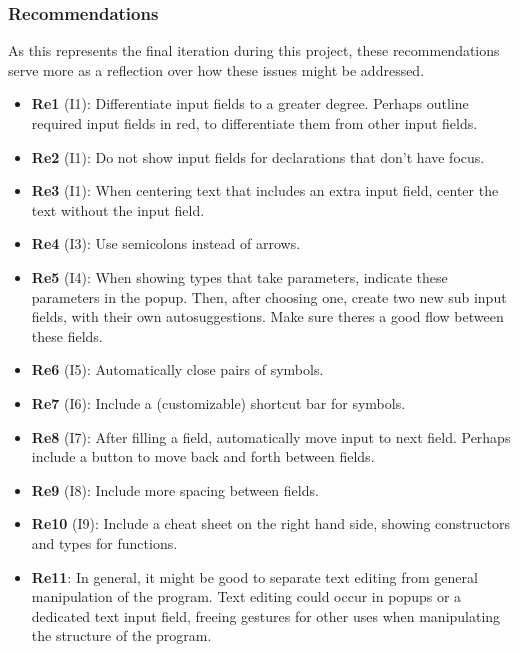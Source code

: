 \subsubsection{Recommendations}
\label{sec:second_recommendations}
As this represents the final iteration during this project, these
recommendations serve more as a reflection over how these issues might be
addressed.

\begin{itemize}
    \item \textbf{Re1} (I1): Differentiate input fields to a greater degree. Perhaps outline required input fields in red, to differentiate them from other input fields.
    \item \textbf{Re2} (I1): Do not show input fields for declarations that don’t have focus.
    \item \textbf{Re3} (I1): When centering text that includes an extra input field, center the text without the input field. 
    \item \textbf{Re4} (I3): Use semicolons instead of arrows.
    \item \textbf{Re5} (I4): When showing types that take parameters, indicate these parameters in the popup. Then, after choosing one, create two new sub input fields, with their own autosuggestions. Make sure theres a good flow between these fields.
    \item \textbf{Re6} (I5): Automatically close pairs of symbols.
    \item \textbf{Re7} (I6): Include a (customizable) shortcut bar for symbols.
    \item \textbf{Re8} (I7): After filling a field, automatically move input to next field. Perhaps include a button to move back and forth between fields.
    \item \textbf{Re9} (I8): Include more spacing between fields.
    \item \textbf{Re10} (I9): Include a cheat sheet on the right hand side, showing constructors and types for functions.
    \item \textbf{Re11}: In general, it might be good to separate text editing from general manipulation of the program. Text editing could occur in popups or a dedicated text input field, freeing gestures for other uses when manipulating the structure of the program.
\end{itemize}

